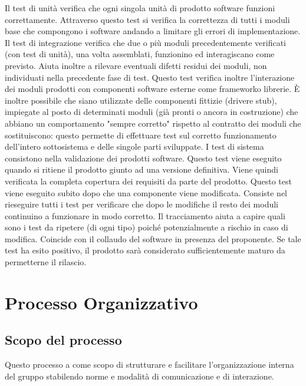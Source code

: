 \documentclass[a4paper,11pt]{article}
\begin{document}
				Il test di unità verifica che ogni singola unità di prodotto software funzioni correttamente.
Attraverso questo test si verifica la correttezza di tutti i moduli base che compongono i software andando
a limitare gli errori di implementazione.
				Il test di integrazione verifica che due o più moduli precedentemente verificati (con test di unità), una volta assemblati, funzionino ed interagiscano come previsto. Aiuta inoltre a rilevare eventuali difetti residui dei moduli, non individuati nella precedente fase di test. Questo test verifica inoltre l'interazione dei moduli prodotti con componenti software esterne come framework\addglos o librerie. È inoltre possibile che siano utilizzate delle componenti fittizie (driver\addglos e stub\addglos), impiegate al posto di determinati moduli (già pronti o ancora in costruzione) che abbiano un comportamento "sempre corretto" rispetto al contratto dei moduli che sostituiscono: questo permette di effettuare test sul corretto funzionamento dell'intero sottosistema e delle singole parti sviluppate.
				I test di sistema consistono nella validazione dei prodotti software. Questo test viene eseguito quando si ritiene il prodotto giunto ad una versione definitiva. Viene quindi verificata la completa copertura dei requisiti da parte del prodotto.
				Questo test viene eseguito subito dopo che una componente viene modificata. Consiste nel rieseguire tutti i test per verificare che dopo le modifiche il resto dei moduli continuino a funzionare in modo corretto. Il tracciamento aiuta a capire quali sono i test da ripetere (di ogni tipo) poiché potenzialmente a rischio in caso di modifica.
				Coincide con il collaudo del software in presenza del proponente. Se tale test ha esito positivo, il prodotto sarà considerato sufficientemente maturo da permetterne il rilascio.
		\pagebreak
	\section{Processo Organizzativo}
		\subsection{Scopo del processo}
		Questo processo a come scopo di strutturare e facilitare l'organizzazione interna del gruppo stabilendo norme e modalità di comunicazione e di interazione.
		
\end{document}
